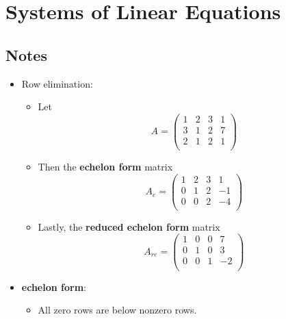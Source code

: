 \documentclass[../../notes.tex]{subfiles}
\begin{document}
\chapter{Systems of Linear Equations}
\section{Notes}
\begin{itemize}
    \item {}Row elimination:
    \begin{itemize}
        \item Let
        \begin{equation*}
            A =
            \begin{pmatrix}
                1 & 2 & 3 & 1\\
                3 & 1 & 2 & 7\\
                2 & 1 & 2 & 1\\
            \end{pmatrix}
        \end{equation*}
        \item Then the \textbf{echelon form} matrix
        \begin{equation*}
            A_e =
            \begin{pmatrix}
                1 & 2 & 3 & 1\\
                0 & 1 & 2 & -1\\
                0 & 0 & 2 & -4\\
            \end{pmatrix}
        \end{equation*}
        \item Lastly, the \textbf{reduced echelon form} matrix
        \begin{equation*}
            A_{re} =
            \begin{pmatrix}
                1 & 0 & 0 & 7\\
                0 & 1 & 0 & 3\\
                0 & 0 & 1 & -2\\
            \end{pmatrix}
        \end{equation*}
    \end{itemize}
    \item \textbf{echelon form}:
    \begin{itemize}
        \item All zero rows are below nonzero rows.

\end{itemize}
\end{itemize}
\end{document}
